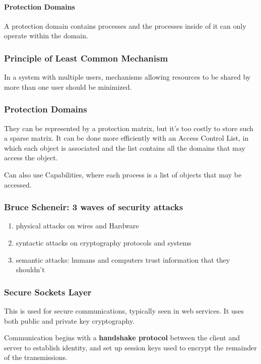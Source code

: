 \documentclass{article}
\begin{document}
\paragraph{Protection Domains} A protection domain contains processes and the processes inside of it can only operate within the domain.

\subsubsection{Principle of Least Common Mechanism} In a system with multiple users, mechanisms allowing resources to be shared by more than one user should be minimized.

\subsubsection{Protection Domains}

They can be represented by a protection matrix, but it's too costly to store such a sparse matrix. It can be done more efficiently with an Access Control List, in which each object is associated and the list contains all the domains that may access the object.

Can also use Capabilities, where each process is a list of objects that may be accessed.

\subsubsection{Bruce Scheneir: 3 waves of security attacks}

\begin{enumerate}
  \item physical attacks on wires and Hardware
  \item syntactic attacks on cryptography protocols and systems
  \item semantic attacks: humans and computers trust information that they shouldn't
\end{enumerate}

\subsubsection{Secure Sockets Layer}

This is used for secure communications, typically seen in web services. It uses both public and private key cryptography.

Communication begins with a \textbf{handshake protocol} between the client and server to establish identity, and set up session keys used to encrypt the remainder of the transmissions.
\end{document}
